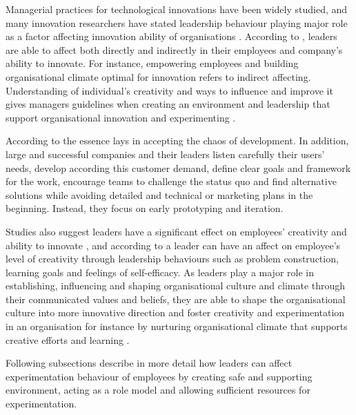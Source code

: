 Managerial practices for technological innovations have been widely studied, and many innovation researchers have stated leadership behaviour playing major role as a factor affecting innovation ability of organisations \citep{buijs2007innovation,jung2003role,jung2001transformational,amabile1998kill,mumford1988creativity}. According to \citet{jung2003role}, leaders are able to affect both directly and indirectly in their employees and company's ability to innovate. For instance, empowering employees and building organisational climate optimal for innovation refers to indirect affecting. Understanding of individual's creativity and ways to influence and improve it gives managers guidelines when creating an environment and leadership that support organisational innovation and experimenting \citep{redmond1993putting}. 

According to \citet{quinn1985managing} the essence lays in accepting the chaos of development. In addition, large and successful companies and their leaders listen carefully their users' needs, develop according this customer demand, define clear goals and framework for the work, encourage teams to challenge the status quo and find alternative solutions while avoiding detailed and technical or marketing plans in the beginning. Instead, they focus on early prototyping and iteration. \citep{quinn1985managing}

 Studies also suggest leaders have a significant effect on employees' creativity and ability to innovate \citep{mumford2002leading,jung2001transformational,amabile1998kill,hennessey19881}, and according to \citet{redmond1993putting} a leader can have an affect on employee's level of creativity through leadership behaviours such as problem construction, learning goals and feelings of self-efficacy. As leaders play a major role in establishing, influencing and shaping organisational culture and climate through their communicated values and beliefs, they are able to shape the organisational culture into more innovative direction and foster creativity and experimentation in an organisation \citep{jung2003role,schein2010organizational} for instance by nurturing organisational climate that supports creative efforts and learning \citep{yukl2002leadership}. 

Following subsections describe in more detail how leaders can affect experimentation behaviour of employees by creating safe and supporting environment, acting as a role model and allowing sufficient resources for experimentation. 

